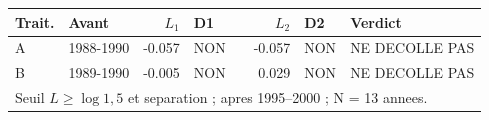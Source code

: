 \begin{tabular}{llrllrll}
\toprule
Trait. & Avant & $L_1$ & D1 & & $L_2$ & D2 & Verdict \\
\midrule
A & 1988-1990 & -0.057 & NON & & -0.057 & NON & NE DECOLLE PAS \\
B & 1989-1990 & -0.005 & NON & & 0.029 & NON & NE DECOLLE PAS \\
\bottomrule
\multicolumn{8}{l}{\footnotesize Seuil $L \geq \log 1{,}5$ et separation ; apres 1995--2000 ; N = 13 annees.} \\
\end{tabular}
